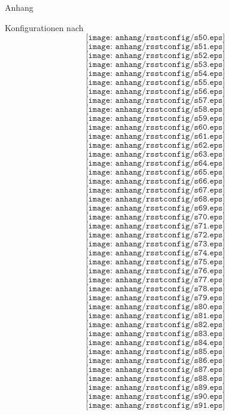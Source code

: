 \begin{chapter}{Anhang}
\begin{section}{Konfigurationen nach \rsst}
  \[ \texttt{[image: anhang/rsstconfig/s50.eps]}\]
  \[ \texttt{[image: anhang/rsstconfig/s51.eps]}\]
  \[ \texttt{[image: anhang/rsstconfig/s52.eps]}\]
  \[ \texttt{[image: anhang/rsstconfig/s53.eps]}\]
  \[ \texttt{[image: anhang/rsstconfig/s54.eps]}\]
  \[ \texttt{[image: anhang/rsstconfig/s55.eps]}\]
  \[ \texttt{[image: anhang/rsstconfig/s56.eps]}\]
  \[ \texttt{[image: anhang/rsstconfig/s57.eps]}\]
  \[ \texttt{[image: anhang/rsstconfig/s58.eps]}\]
  \[ \texttt{[image: anhang/rsstconfig/s59.eps]}\]
  \[ \texttt{[image: anhang/rsstconfig/s60.eps]}\]
  \[ \texttt{[image: anhang/rsstconfig/s61.eps]}\]
  \[ \texttt{[image: anhang/rsstconfig/s62.eps]}\]
  \[ \texttt{[image: anhang/rsstconfig/s63.eps]}\]
  \[ \texttt{[image: anhang/rsstconfig/s64.eps]}\]
  \[ \texttt{[image: anhang/rsstconfig/s65.eps]}\]
  \[ \texttt{[image: anhang/rsstconfig/s66.eps]}\]
  \[ \texttt{[image: anhang/rsstconfig/s67.eps]}\]
  \[ \texttt{[image: anhang/rsstconfig/s68.eps]}\]
  \[ \texttt{[image: anhang/rsstconfig/s69.eps]}\]
  \[ \texttt{[image: anhang/rsstconfig/s70.eps]}\]
  \[ \texttt{[image: anhang/rsstconfig/s71.eps]}\]
  \[ \texttt{[image: anhang/rsstconfig/s72.eps]}\]
  \[ \texttt{[image: anhang/rsstconfig/s73.eps]}\]
  \[ \texttt{[image: anhang/rsstconfig/s74.eps]}\]
  \[ \texttt{[image: anhang/rsstconfig/s75.eps]}\]
  \[ \texttt{[image: anhang/rsstconfig/s76.eps]}\]
  \[ \texttt{[image: anhang/rsstconfig/s77.eps]}\]
  \[ \texttt{[image: anhang/rsstconfig/s78.eps]}\]
  \[ \texttt{[image: anhang/rsstconfig/s79.eps]}\]
  \[ \texttt{[image: anhang/rsstconfig/s80.eps]}\]
  \[ \texttt{[image: anhang/rsstconfig/s81.eps]}\]
  \[ \texttt{[image: anhang/rsstconfig/s82.eps]}\]
  \[ \texttt{[image: anhang/rsstconfig/s83.eps]}\]
  \[ \texttt{[image: anhang/rsstconfig/s84.eps]}\]
  \[ \texttt{[image: anhang/rsstconfig/s85.eps]}\]
  \[ \texttt{[image: anhang/rsstconfig/s86.eps]}\]
  \[ \texttt{[image: anhang/rsstconfig/s87.eps]}\]
  \[ \texttt{[image: anhang/rsstconfig/s88.eps]}\]
  \[ \texttt{[image: anhang/rsstconfig/s89.eps]}\]
  \[ \texttt{[image: anhang/rsstconfig/s90.eps]}\]
  \[ \texttt{[image: anhang/rsstconfig/s91.eps]}\]
 \end{section}
\end{chapter}